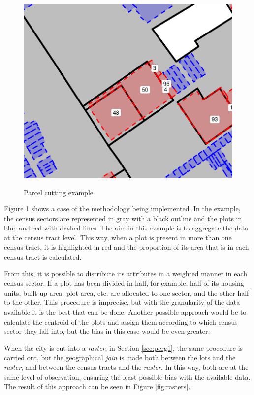 \begin{apendicesenv}
    \begin{figure}[h]
        \centering
        \caption{Parcel cutting example}
        \includegraphics[width = .75\linewidth]{figuras/corte_lote.pdf}
        \label{fig:corte-lote}
    \end{figure}
    
    Figure \ref{fig:corte-lote} shows a case of the methodology being implemented. In the example, the census sectors are represented in gray with a black outline and the plots in blue and red with dashed lines. The aim in this example is to aggregate the data at the census tract level. This way, when a plot is present in more than one census tract, it is highlighted in red and the proportion of its area that is in each census tract is calculated.
    
    From this, it is possible to distribute its attributes in a weighted manner in each census sector. If a plot has been divided in half, for example, half of its housing units, built-up area, plot area, etc. are allocated to one sector, and the other half to the other. This procedure is imprecise, but with the granularity of the data available it is the best that can be done. Another possible approach would be to calculate the centroid of the plots and assign them according to which census sector they fall into, but the bias in this case would be even greater.
    
    When the city is cut into a \textit{raster}, in Section \ref{sec:perg1}, the same procedure is carried out, but the geographical \textit{join} is made both between the lots and the \textit{raster}, and between the census tracts and the \textit{raster}. In this way, both are at the same level of observation, ensuring the least possible bias with the available data. The result of this approach can be seen in Figure \ref{fig:rasters}.
    

\end{apendicesenv}
